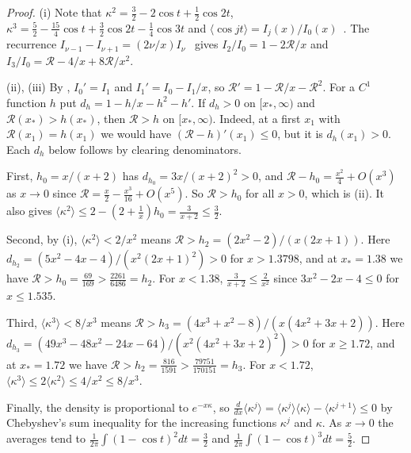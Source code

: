 \begin{proof}
(i) Note that $\kappa^2=\frac32-2\cos t+\frac12\cos2t$,
$\kappa^3=\frac52-\frac{15}4\cos t+\frac32\cos2t-\frac14\cos3t$ and
$\langle\cos jt\rangle=I_j(x)/I_0(x)$~\cite[Eq.~10.32.3]{dlmf}. The recurrence
$I_{\nu-1}-I_{\nu+1}=(2\nu/x)I_\nu$~\cite[Eq.~10.29.1]{dlmf} gives $I_2/I_0=1-2\mathcal R/x$ and
$I_3/I_0=\mathcal R-4/x+8\mathcal R/x^2$.

(ii), (iii) By \cite[Eqs.~10.29.2, 10.29.3]{dlmf}, $I_0'=I_1$ and $I_1'=I_0-I_1/x$, so
$\mathcal R'=1-\mathcal R/x-\mathcal R^2$. For a $C^1$ function $h$ put $d_h=1-h/x-h^2-h'$. If
$d_h>0$ on $[x_*,\infty)$ and $\mathcal R(x_*)>h(x_*)$, then $\mathcal R>h$ on $[x_*,\infty)$.
Indeed, at a first $x_1$ with $\mathcal R(x_1)=h(x_1)$ we would have
$(\mathcal R-h)'(x_1)\le0$, but it is $d_h(x_1)>0$. Each $d_h$ below follows by clearing
denominators.

First, $h_0=x/(x+2)$ has $d_{h_0}=3x/(x+2)^2>0$, and $\mathcal R-h_0=\frac{x^2}4+O(x^3)$ as $x\to0$
since $\mathcal R=\frac x2-\frac{x^3}{16}+O(x^5)$. So $\mathcal R>h_0$ for all $x>0$, which is
(ii). It also gives $\langle\kappa^2\rangle\le2-(2+\frac1x)h_0=\frac3{x+2}\le\frac32$.

Second, by (i), $\langle\kappa^2\rangle<2/x^2$ means $\mathcal R>h_2=(2x^2-2)/(x(2x+1))$. Here
$d_{h_2}=(5x^2-4x-4)/(x^2(2x+1)^2)>0$ for $x>1.3798$, and at $x_*=1.38$ we have
$\mathcal R>h_0=\frac{69}{169}>\frac{2261}{6486}=h_2$. For $x<1.38$, $\frac3{x+2}\le\frac2{x^2}$ since
$3x^2-2x-4\le0$ for $x\le1.535$.

Third, $\langle\kappa^3\rangle<8/x^3$ means $\mathcal R>h_3=(4x^3+x^2-8)/(x(4x^2+3x+2))$. Here
$d_{h_3}=(49x^3-48x^2-24x-64)/(x^2(4x^2+3x+2)^2)>0$ for $x\ge1.72$, and at $x_*=1.72$ we have
$\mathcal R>h_2=\frac{816}{1591}>\frac{79751}{170151}=h_3$. For $x<1.72$,
$\langle\kappa^3\rangle\le2\langle\kappa^2\rangle\le4/x^2\le8/x^3$.

Finally, the density is proportional to $e^{-x\kappa}$, so
$\frac d{dx}\langle\kappa^j\rangle
=\langle\kappa^j\rangle\langle\kappa\rangle-\langle\kappa^{j+1}\rangle\le0$ by Chebyshev's sum
inequality for the increasing functions $\kappa^j$ and $\kappa$. As $x\to0$ the averages tend to
$\frac1{2\pi}\int(1-\cos t)^2dt=\frac32$ and $\frac1{2\pi}\int(1-\cos t)^3dt=\frac52$.
\end{proof}

